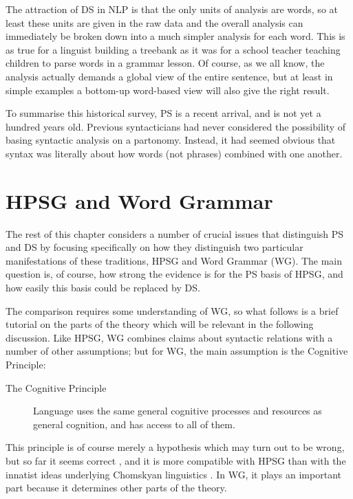 \documentclass[output=paper]{langscibook}
\begin{document}
The attraction of DS in NLP is that the only units of analysis are words, so at least these units are given in the raw data and the overall analysis can immediately be broken down into a much simpler analysis for each word. This is as true for a linguist building a treebank as it was for a school teacher teaching children to parse words in a grammar lesson. Of course, as we all know, the analysis actually demands a global view of the entire sentence, but at least in simple examples a bottom-up word-based view will also give the right result.

To summarise this historical survey, PS is a recent arrival, and is not yet a hundred years old. Previous syntacticians had never considered the possibility of basing syntactic analysis on a partonomy. Instead, it had seemed obvious that syntax was literally about how words (not phrases) combined with one another.


\section{HPSG and Word Grammar}
\label{sec:3}

The rest of this chapter considers a number of crucial issues that distinguish PS and DS by focusing specifically on how they distinguish two particular manifestations of these traditions, HPSG and Word Grammar (WG). The main question is, of course, how strong the evidence is for the PS basis of HPSG, and how easily this basis could be replaced by DS.

The comparison requires some understanding of WG, so what follows is a brief tutorial on the parts of the theory which will be relevant in the following discussion. Like HPSG, WG combines claims about syntactic relations with a number of other assumptions; but for WG, the main assumption is the Cognitive Principle:

\begin{description}
	\item[The Cognitive Principle] \label{it:CogPrin}Language uses the same general cognitive processes and resources as general cognition, and has access to all of them.
\end{description}

This principle is of course merely a hypothesis which may turn out to be wrong, but so far it seems correct \citep[494]{MuellerGT-Eng2}, and it is more compatible with HPSG than with the innatist ideas underlying Chomskyan linguistics \citep{Berwick&co2013}. In WG, it plays an important part because it determines other parts of the theory.
\end{document}
